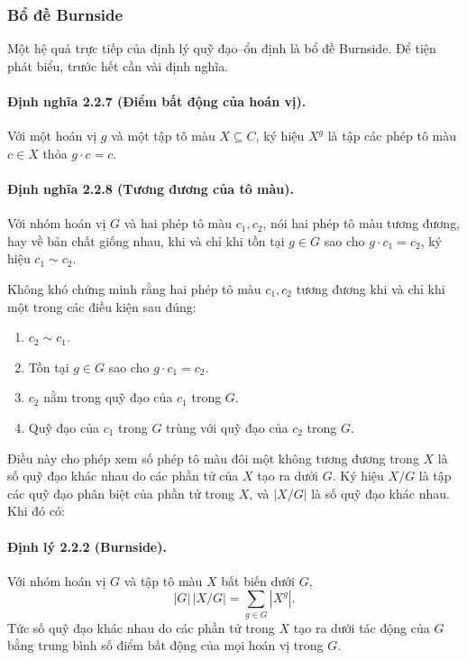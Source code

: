 \documentclass[11pt]{article}
\begin{document}
\subsubsection{Bổ đề Burnside}

Một hệ quả trực tiếp của định lý quỹ đạo--ổn định là bổ đề Burnside. Để tiện
phát biểu, trước hết cần vài định nghĩa.

\paragraph{Định nghĩa 2.2.7 (Điểm bất động của hoán vị).}
Với một hoán vị \(g\) và một tập tô màu \(X\subseteq C\), ký hiệu \(X^g\) là
tập các phép tô màu \(c\in X\) thỏa \(g\cdot c=c\).

\paragraph{Định nghĩa 2.2.8 (Tương đương của tô màu).}
Với nhóm hoán vị \(G\) và hai phép tô màu \(c_1,c_2\), nói hai phép tô màu
tương đương, hay về bản chất giống nhau, khi và chỉ khi tồn tại \(g\in G\) sao
cho \(g\cdot c_1=c_2\), ký hiệu \(c_1\sim c_2\).

Không khó chứng minh rằng hai phép tô màu \(c_1,c_2\) tương đương khi và chỉ
khi một trong các điều kiện sau đúng:
\begin{enumerate}
  \item \(c_2\sim c_1\).
  \item Tồn tại \(g\in G\) sao cho \(g\cdot c_1=c_2\).
  \item \(c_2\) nằm trong quỹ đạo của \(c_1\) trong \(G\).
  \item Quỹ đạo của \(c_1\) trong \(G\) trùng với quỹ đạo của \(c_2\) trong
  \(G\).
\end{enumerate}

Điều này cho phép xem số phép tô màu đôi một không tương đương trong \(X\) là
số quỹ đạo khác nhau do các phần tử của \(X\) tạo ra dưới \(G\). Ký hiệu
\(X/G\) là tập các quỹ đạo phân biệt của phần tử trong \(X\), và \(|X/G|\) là
số quỹ đạo khác nhau. Khi đó có:

\paragraph{Định lý 2.2.2 (Burnside).}
Với nhóm hoán vị \(G\) và tập tô màu \(X\) bất biến dưới \(G\),
\[
  |G|\,|X/G|=\sum_{g\in G}|X^g|.
\]
Tức số quỹ đạo khác nhau do các phần tử trong \(X\) tạo ra dưới tác động của
\(G\) bằng trung bình số điểm bất động của mọi hoán vị trong \(G\).
\end{document}
